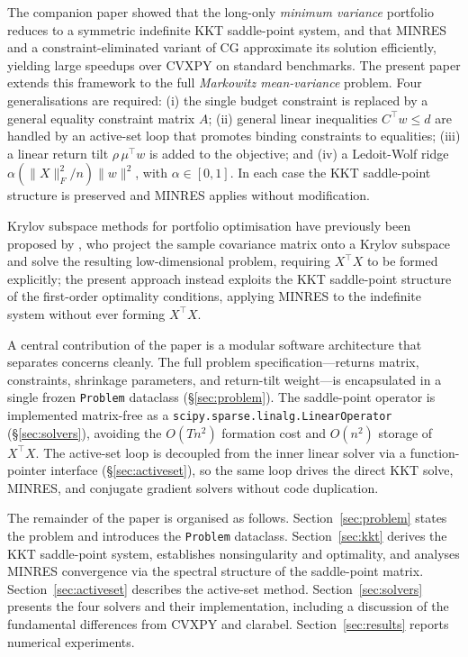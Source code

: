 \documentclass{siam/siamart}
\begin{document}
The companion paper \cite{minvar_paper} showed that the long-only \emph{minimum variance}
portfolio reduces to a symmetric indefinite KKT saddle-point system, and that MINRES
\cite{paige1975} and a constraint-eliminated variant of CG \cite{hestenes1952} approximate
its solution efficiently, yielding large speedups over CVXPY \cite{diamond2016}
on standard benchmarks.
The present paper extends this framework to the full \emph{Markowitz mean-variance} problem.
Four generalisations are required: (i) the single budget constraint is replaced by a general
equality constraint matrix $A$; (ii) general linear inequalities $C^\top w \leq d$ are
handled by an active-set loop that promotes binding constraints to equalities; (iii) a linear
return tilt $\rho\,\mu^\top w$ is added to the objective; and (iv) a Ledoit-Wolf \cite{ledoit2004} ridge
$\alpha(\|X\|_F^2/n)\|w\|^2$, with $\alpha\in[0,1]$.  In each case the KKT
saddle-point structure is preserved and MINRES applies without modification.

Krylov subspace methods for portfolio optimisation have previously been proposed by
\cite{bajeux2012}, who project the sample covariance matrix onto a Krylov subspace and
solve the resulting low-dimensional problem, requiring $X^\top X$ to be formed explicitly;
the present approach instead exploits the KKT saddle-point structure of the first-order
optimality conditions, applying MINRES to the indefinite system without ever forming
$X^\top X$.

A central contribution of the paper is a modular software architecture that separates concerns
cleanly.  The full problem specification---returns matrix, constraints, shrinkage parameters, and
return-tilt weight---is encapsulated in a single frozen \texttt{Problem} dataclass (\S\ref{sec:problem}).
The saddle-point operator is implemented matrix-free as a
\texttt{scipy.sparse.linalg.LinearOperator} (\S\ref{sec:solvers}), avoiding the $O(Tn^2)$
formation cost and $O(n^2)$ storage of $X^\top X$.  The active-set loop is decoupled from the
inner linear solver via a function-pointer interface (\S\ref{sec:activeset}), so the same loop
drives the direct KKT solve, MINRES, and conjugate gradient \cite{hestenes1952} solvers
without code duplication.

The remainder of the paper is organised as follows.  Section~\ref{sec:problem} states the
problem and introduces the \texttt{Problem} dataclass.  Section~\ref{sec:kkt} derives the KKT
saddle-point system, establishes nonsingularity and optimality, and analyses MINRES convergence
via the spectral structure of the saddle-point matrix.  Section~\ref{sec:activeset} describes
the active-set method.  Section~\ref{sec:solvers} presents the four solvers and their
implementation, including a discussion of the fundamental differences from CVXPY and clarabel.
Section~\ref{sec:results} reports numerical experiments.
\end{document}
